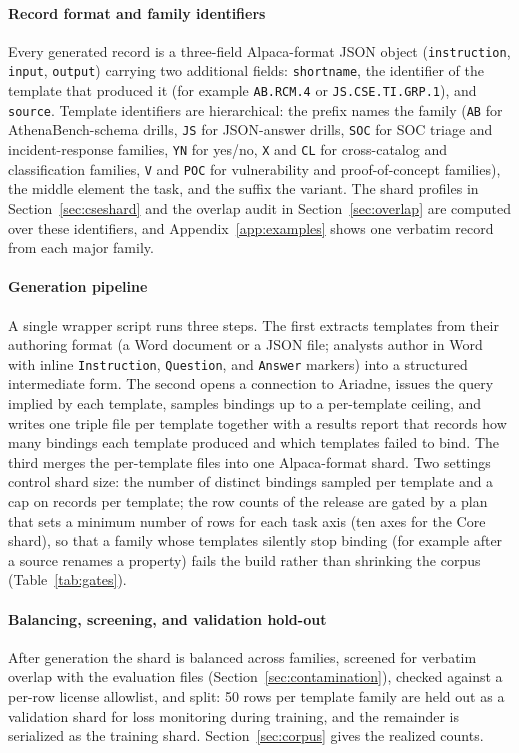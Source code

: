 \documentclass[twocolumn]{svjour3}
\begin{document}
\paragraph{Record format and family identifiers}
Every generated record is a three-field Alpaca-format JSON object (\texttt{instruction}, \texttt{input}, \texttt{output}) carrying two additional fields: \texttt{shortname}, the identifier of the template that produced it (for example \texttt{AB.RCM.4} or \texttt{JS.CSE.TI.GRP.1}), and \texttt{source}. Template identifiers are hierarchical: the prefix names the family (\texttt{AB} for AthenaBench-schema drills, \texttt{JS} for JSON-answer drills, \texttt{SOC} for SOC triage and incident-response families, \texttt{YN} for yes/no, \texttt{X} and \texttt{CL} for cross-catalog and classification families, \texttt{V} and \texttt{POC} for vulnerability and proof-of-concept families), the middle element the task, and the suffix the variant. The shard profiles in Section~\ref{sec:cseshard} and the overlap audit in Section~\ref{sec:overlap} are computed over these identifiers, and Appendix~\ref{app:examples} shows one verbatim record from each major family.

\paragraph{Generation pipeline}
A single wrapper script runs three steps. The first extracts templates from their authoring format (a Word document or a JSON file; analysts author in Word with inline \texttt{Instruction}, \texttt{Question}, and \texttt{Answer} markers) into a structured intermediate form. The second opens a connection to Ariadne, issues the query implied by each template, samples bindings up to a per-template ceiling, and writes one triple file per template together with a results report that records how many bindings each template produced and which templates failed to bind. The third merges the per-template files into one Alpaca-format shard. Two settings control shard size: the number of distinct bindings sampled per template and a cap on records per template; the row counts of the release are gated by a plan that sets a minimum number of rows for each task axis (ten axes for the Core shard), so that a family whose templates silently stop binding (for example after a source renames a property) fails the build rather than shrinking the corpus (Table~\ref{tab:gates}).

\paragraph{Balancing, screening, and validation hold-out}
After generation the shard is balanced across families, screened for verbatim overlap with the evaluation files (Section~\ref{sec:contamination}), checked against a per-row license allowlist, and split: 50 rows per template family are held out as a validation shard for loss monitoring during training, and the remainder is serialized as the training shard. Section~\ref{sec:corpus} gives the realized counts.
\end{document}
